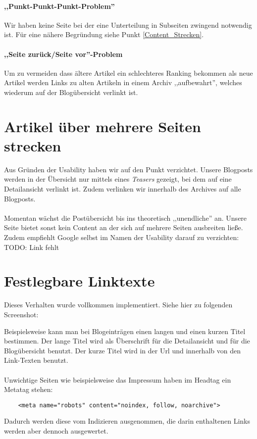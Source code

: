 \paragraph{,,Punkt-Punkt-Punkt-Problem''}
Wir haben keine Seite bei der eine Unterteilung in Subseiten zwingend notwendig
ist. Für eine nähere Begründung siehe Punkt \ref{Content_Strecken}.

\paragraph{,,Seite zurück/Seite vor''-Problem}
Um zu vermeiden dass ältere Artikel ein schlechteres Ranking bekommen als neue
Artikel werden Links zu alten Artikeln in einem Archiv ,,aufbewahrt'', welches
wiederum auf der Blogübersicht verlinkt ist.


\label{Content_Strecken}
\section{Artikel über mehrere Seiten strecken}
Aus Gründen der Usability haben wir auf den Punkt verzichtet. Unsere Blogposts
werden in der Übersicht nur mittels eines \emph{Teasers} gezeigt, bei dem auf
eine Detailansicht verlinkt ist. Zudem verlinken wir innerhalb des Archives auf
alle Blogposts. 
\\
\\
Momentan wächst die Postübersicht bis ins theoretisch ,,unendliche'' an.
Unsere Seite bietet sonst kein Content an der sich auf mehrere Seiten ausbreiten
ließe. Zudem empfiehlt Google selbst im Namen der Usability darauf zu
verzichten:
TODO: Link fehlt


\section{Festlegbare Linktexte}
Dieses Verhalten wurde vollkommen implementiert. Siehe hier  zu folgenden
Screenshot:

Beispielsweise kann man bei Blogeinträgen einen langen und einen kurzen Titel
bestimmen. Der lange Titel wird als Überschrift für die Detailansicht und für
die Blogübersicht benutzt. Der kurze Titel wird in der Url und innerhalb von den
Link-Texten benutzt. 
\\
\\
Unwichtige Seiten wie beispielsweise das Impressum haben im Headtag ein Metatag
stehen:
\begin{verbatim}
    <meta name="robots" content="noindex, follow, noarchive">
\end{verbatim}
Dadurch werden diese vom Indizieren ausgenommen, die darin enthaltenen Links
werden aber dennoch ausgewertet.

